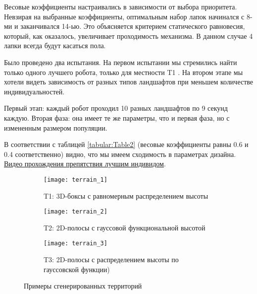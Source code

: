 Весовые коэффициенты настраивались в зависимости от выбора приоритета. Невзирая на выбранные коэффициенты, оптимальным набор лапок начинался с 8-ми и заканчивался 14-ью. Это объясняется критерием статического равновесия, который, как оказалось, увеличивает проходимость механизма. В данном случае 4 лапки всегда будут касаться пола. 

Было проведено два испытания. На первом испытании мы стремились найти только одного лучшего робота, только для местности T1 . На втором этапе мы хотели видеть зависимость от разных типов ландшафтов при меньшем количестве индивидуальностей.

Первый этап: каждый робот проходил 10 разных ландшафтов по 9 секунд каждую. Вторая фаза: она имеет те же параметры, что и первая фаза, но с измененным размером популяции. 

В соответствии с таблицей \ref{tabular:Table2} (весовые коэффициенты равны 0.6 и 0.4 соответственно) видно, что мы имеем сходимость в параметрах дизайна. \href{https://youtu.be/DcovvkTZgsg}{Видео прохождения препятствия лучшим индивидом}.

\begin{figure}[h]
    \begin{subfigure}{0.33\textwidth}
    \centering\texttt{[image: terrain\_1]} 
    \caption{T1: 3D-боксы с равномерным распределением высоты}
    \label{fig:terrain_1}
    \end{subfigure}
    \begin{subfigure}{0.33\textwidth}
    \centering\texttt{[image: terrain\_2]} 
    \caption{T2: 2D-полосы с гауссовой функциональной высотой}
    \label{fig:terrain_2}
    \end{subfigure}
    \begin{subfigure}{0.33\textwidth}
    \centering\texttt{[image: terrain\_3]}
    \caption{T3: 2D-полосы с распределением высоты по гауссовской функции)}
    \label{fig:terrain_3}
    \end{subfigure}
     
    \caption{Примеры сгенерированных территорий}
    \label{fig:terrains}
\end{figure}
\vspace{-0.5cm}

